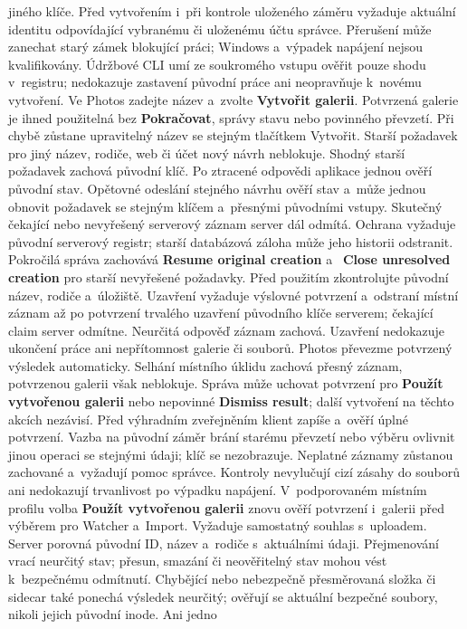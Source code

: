 \documentclass[11pt,a4paper]{article}
\newcommand{\ui}[1]{\textbf{#1}}
\begin{document}
jiného klíče. Před vytvořením i~při
kontrole uloženého záměru vyžaduje aktuální identitu odpovídající vybranému či
uloženému účtu správce. Přerušení může
zanechat starý zámek blokující práci; Windows a~výpadek napájení nejsou
kvalifikovány. Údržbové CLI umí ze soukromého vstupu ověřit pouze shodu
v~registru; nedokazuje zastavení původní práce ani neopravňuje k~novému
vytvoření.
Ve Photos zadejte název a~zvolte \ui{Vytvořit galerii}. Potvrzená galerie je
ihned použitelná bez \ui{Pokračovat}, správy stavu nebo povinného převzetí.
Při chybě zůstane upravitelný název se stejným tlačítkem Vytvořit. Starší
požadavek pro jiný název, rodiče, web či účet nový návrh neblokuje. Shodný
starší požadavek zachová původní klíč. Po ztracené odpovědi aplikace jednou
ověří původní stav. Opětovné odeslání stejného návrhu ověří stav a~může jednou
obnovit požadavek se stejným klíčem a~přesnými původními vstupy. Skutečný
čekající nebo nevyřešený serverový záznam server dál odmítá. Ochrana vyžaduje
původní serverový registr; starší databázová záloha může jeho historii odstranit.
Pokročilá správa zachovává \ui{Resume original creation} a~
\ui{Close unresolved creation} pro starší nevyřešené požadavky. Před použitím
zkontrolujte původní název, rodiče a~úložiště. Uzavření vyžaduje výslovné
potvrzení a~odstraní místní záznam až po potvrzení trvalého uzavření původního
klíče serverem; čekající claim server odmítne. Neurčitá odpověď záznam zachová.
Uzavření nedokazuje ukončení práce ani nepřítomnost galerie či souborů.
Photos převezme potvrzený výsledek automaticky. Selhání místního úklidu zachová
přesný záznam, potvrzenou galerii však neblokuje. Správa může uchovat potvrzení
pro \ui{Použít vytvořenou galerii} nebo nepovinné \ui{Dismiss result}; další
vytvoření na těchto akcích nezávisí. Před výhradním zveřejněním klient zapíše
a~ověří úplné potvrzení. Vazba na původní záměr brání starému převzetí nebo
výběru ovlivnit jinou operaci se stejnými údaji; klíč se nezobrazuje. Neplatné
záznamy zůstanou zachované a~vyžadují pomoc správce.
Kontroly nevylučují cizí zásahy do
souborů ani nedokazují trvanlivost po výpadku napájení. V~podporovaném místním
profilu volba \ui{Použít vytvořenou galerii} znovu ověří potvrzení
i~galerii před výběrem pro Watcher a~Import. Vyžaduje samostatný souhlas
s~uploadem. Server porovná původní ID,
název a~rodiče s~aktuálními údaji. Přejmenování vrací neurčitý stav; přesun,
smazání či neověřitelný stav mohou vést k~bezpečnému odmítnutí. Chybějící nebo
nebezpečně přesměrovaná složka či sidecar také ponechá výsledek neurčitý;
ověřují se aktuální bezpečné soubory, nikoli jejich původní inode. Ani jedno
\end{document}
